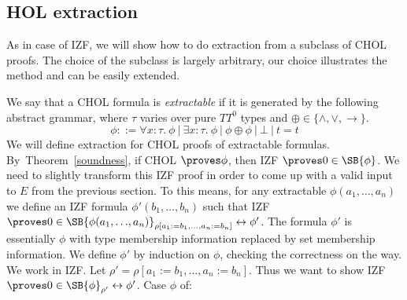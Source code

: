 \documentclass{LMCS}
\newcommand\iffl{\ensuremath{\leftrightarrow}}
\newcommand{\p}{\proves}
\begin{document}
\subsection{HOL extraction}

As in case of IZF, we will show how to do extraction from a subclass of CHOL
proofs. The choice of the subclass is largely arbitrary, our choice
illustrates the method and can be easily extended.

We say that a CHOL formula is \emph{extractable} if it is generated by the
following abstract grammar, where $\tau$ varies over pure $TT^{0}$ types and $\oplus \in \{ \land, \lor,
\to \}$. 
\[
\phi ::= \forall x : \tau.\ \phi\ |\ \exists x : \tau.\ \phi\ |\ \phi \oplus \phi\
|\ \bot\ |\ t = t
\]
\newcommand{\ppp}{{\rho[a_1:=b_1,{\ldots} , a_n:=b_n]}}
\newcommand{\srr}[1]{\SB{#1}_{\rho'}}
We will define extraction for CHOL proofs of extractable formulas.
By~Theorem~\ref{soundness}, if CHOL $\p \phi$, then
IZF $\p 0 \in \SB{\phi}$. We need to slightly transform this IZF proof 
in order to come up with a valid input to $E$ from the previous section. To
this means, for any extractable $\phi(a_1, {\ldots} , a_n)$ we define an
IZF formula $\phi'(b_1, {\ldots} , b_n)$ such that IZF $\p 0 \in
\SB{\phi(a_1, {\ldots} , a_n)}_{\rho[a_1:=b_1, {\ldots} , a_n := b_n]} \iffl
\phi'$. The formula $\phi'$ is essentially $\phi$ with type membership information replaced by set membership information. We define $\phi'$ by induction on
$\phi$, checking the correctness on the way. We work in IZF. Let $\rho' =
\ppp$. Thus we want to show IZF $\p 0 \in \srr{\phi} \iffl \phi'$. Case $\phi$ of:
\end{document}
